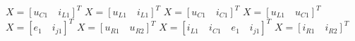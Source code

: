 $X=[u_{C1}\quad i_{L1}]^T$
$X=[u_{L1}\quad i_{L1}]^T$
$X=[u_{C1}\quad i_{C1}]^T$
$X=[u_{L1}\quad u_{C1}]^T$
$X=[e_1\quad i_{j1}]^T$
$X=[u_{R1}\quad u_{R2}]^T$
$X=[i_{L1}\quad i_{C1}\quad e_1\quad i_{j1}]^T$
$X=[i_{R1}\quad i_{R2}]^T$
